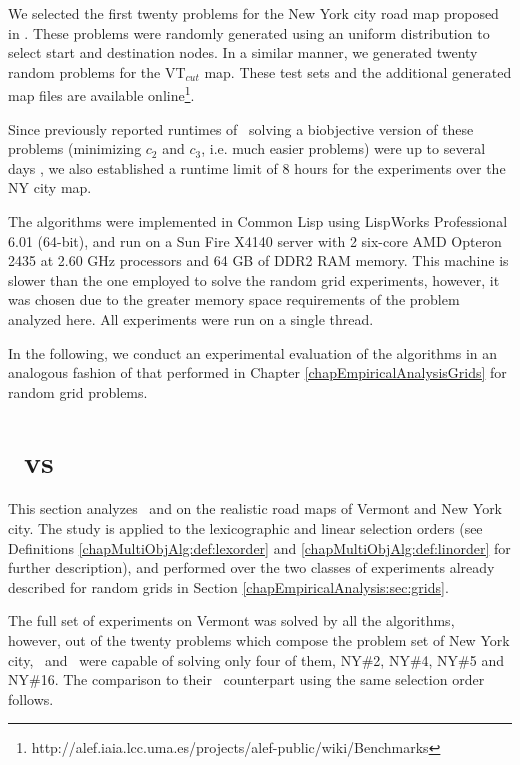 We selected the first twenty problems for the New York city road map proposed in \cite{Machuca2012}. These problems were randomly generated using an uniform distribution to select start and destination nodes. In a similar manner, we generated twenty random problems for the VT$_{cut}$ map. These test sets and the additional generated map files are available online\footnote{http://alef.iaia.lcc.uma.es/projects/alef-public/wiki/Benchmarks}. 

Since previously reported runtimes of \namoa \ solving a biobjective version of these problems (minimizing  $c_2$ and $c_3$, i.e. much easier problems) were up to several days \citep{Machuca2011a}, we also established a runtime limit of 8 hours for the experiments over the NY city map. 

The algorithms were implemented in Common Lisp using LispWorks Professional 6.01 (64-bit), and run on a Sun Fire X4140 server with 2 six-core AMD Opteron 2435 at 2.60 GHz processors and 64 GB of DDR2 RAM memory. This machine is slower than the one employed to solve the random grid experiments, however, it was chosen due to the greater memory space requirements of the problem analyzed here. All experiments were run on a single thread.

In the following, we conduct an experimental evaluation of the algorithms in an analogous fashion of that performed in Chapter \ref{chapEmpiricalAnalysisGrids} for random grid problems.

\section{\texorpdfstring{\lexgo}{LEXGO*} \ vs \texorpdfstring{\namoa}{NAMOA*}}
\label{chapEmpiricalAnalysis:sec:resultsdimacslexgo}

This section analyzes \namoa \ and \lexgo on the realistic road maps of Vermont and New York city. The study is applied to the lexicographic and linear selection orders (see Definitions \ref{chapMultiObjAlg:def:lexorder} and \ref{chapMultiObjAlg:def:linorder} for further description), and performed over the two classes of experiments already described for random grids in Section \ref{chapEmpiricalAnalysis:sec:grids}.

The full set of experiments on Vermont was solved by all the algorithms, however, out of the twenty problems which compose the problem set of New York city, \namoalex \ and \namoalin \ were capable of solving only four of them, NY\#2, NY\#4, NY\#5 and NY\#16. The comparison to their \lexgo \ counterpart using the same selection order follows.
 
